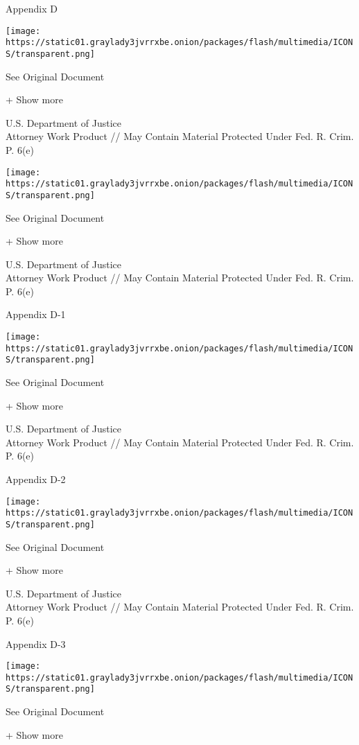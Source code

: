 Appendix D

\protect\hyperlink{}{}

\texttt{[image: https://static01.graylady3jvrrxbe.onion/packages/flash/multimedia/ICONS/transparent.png]}

See Original Document

+ Show more

U.S. Department of Justice\\
Attorney Work Product // May Contain Material Protected Under Fed. R.
Crim. P. 6(e)

\protect\hyperlink{}{}

\texttt{[image: https://static01.graylady3jvrrxbe.onion/packages/flash/multimedia/ICONS/transparent.png]}

See Original Document

+ Show more

U.S. Department of Justice\\
Attorney Work Product // May Contain Material Protected Under Fed. R.
Crim. P. 6(e)

Appendix D-1

\protect\hyperlink{}{}

\texttt{[image: https://static01.graylady3jvrrxbe.onion/packages/flash/multimedia/ICONS/transparent.png]}

See Original Document

+ Show more

U.S. Department of Justice\\
Attorney Work Product // May Contain Material Protected Under Fed. R.
Crim. P. 6(e)

Appendix D-2

\protect\hyperlink{}{}

\texttt{[image: https://static01.graylady3jvrrxbe.onion/packages/flash/multimedia/ICONS/transparent.png]}

See Original Document

+ Show more

U.S. Department of Justice\\
Attorney Work Product // May Contain Material Protected Under Fed. R.
Crim. P. 6(e)

Appendix D-3

\protect\hyperlink{}{}

\texttt{[image: https://static01.graylady3jvrrxbe.onion/packages/flash/multimedia/ICONS/transparent.png]}

See Original Document

+ Show more

